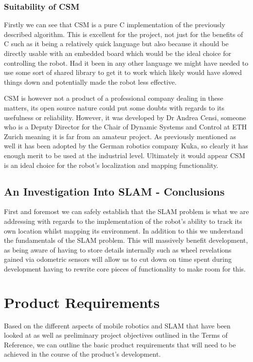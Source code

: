 			\subsection{Suitability of CSM}
			Firstly we can see that CSM is a pure C implementation of the previously described algorithm. This is excellent for the project, not just for the benefits of C such as it being a relatively quick language but also because it should be directly usable with an embedded board which would be the ideal choice for controlling the robot. Had it been in any other language we might have needed to use some sort of shared library to get it to work which likely would have slowed things down and potentially made the robot less effective. 
			
			CSM is however not a product of a professional company dealing in these matters, its open source nature could put some doubts with regards to its usefulness or reliability. However, it was developed by Dr Andrea Censi, someone who is a Deputy Director for the Chair of Dynamic Systems and Control at ETH Zurich meaning it is far from an amateur project. As previously mentioned as well it has been adopted by the German robotics company Kuka, so clearly it has enough merit to be used at the industrial level. Ultimately it would appear CSM is an ideal choice for the robot's localization and mapping functionality.
					
			\section{An Investigation Into SLAM - Conclusions}	
			First and foremost we can safely establish that the SLAM problem is what we are addressing with regards to the implementation of the robot's ability to track its own location whilst mapping its environment. In addition to this we understand the fundamentals of the SLAM problem. This will massively benefit development, as being aware of having to store details internally such as wheel revelations gained via odometric sensors will allow us to cut down on time spent during development having to rewrite core pieces of functionality to make room for this. 

		\chapter{Product Requirements}
		Based on the different aspects of mobile robotics and SLAM that have been looked at as well as preliminary project objectives outlined in the Terms of Reference, we can outline the basic product requirements that will need to be achieved in the course of the product's development.
		

